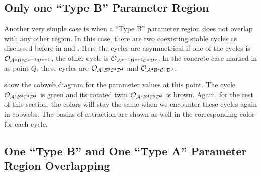 \subsection{Only one ``Type B'' Parameter Region}

Another very simple case is when a ``Type B'' parameter region does not overlap with any other region.
In this case, there are two coexisting stable cycles as discussed before in  and .
Here the cycles are asymmetrical if one of the cycles is $\mathcal{O}_{\mathcal{A}^x\mathcal{B}^y\mathcal{C}^{x-1}\mathcal{D}^{y+1}}$, the other cycle is $\mathcal{O}_{\mathcal{A}^{x-1}\mathcal{B}^{y+1}\mathcal{C}^x\mathcal{D}^y}$.
In the concrete case marked in  as point $Q$, these cycles are $\mathcal{O}_{\mathcal{A}^5\mathcal{B}^3\mathcal{C}^4\mathcal{D}^4}$ and $\mathcal{O}_{\mathcal{A}^4\mathcal{B}^4\mathcal{C}^5\mathcal{D}^3}$.

 show the cobweb diagram for the parameter values at this point.
The cycle $\mathcal{O}_{\mathcal{A}^5\mathcal{B}^3\mathcal{C}^4\mathcal{D}^4}$ is green and its rotated twin $\mathcal{O}_{\mathcal{A}^4\mathcal{B}^4\mathcal{C}^5\mathcal{D}^3}$ is brown.
Again, for the rest of this section, the colors will stay the same when we encounter these cycles again in cobwebs.
The basins of attraction are shown as well in the corresponding color for each cycle.

\subsection{One ``Type B'' and One ``Type A'' Parameter Region Overlapping}
\label{sec:minrep.coex.BA}

